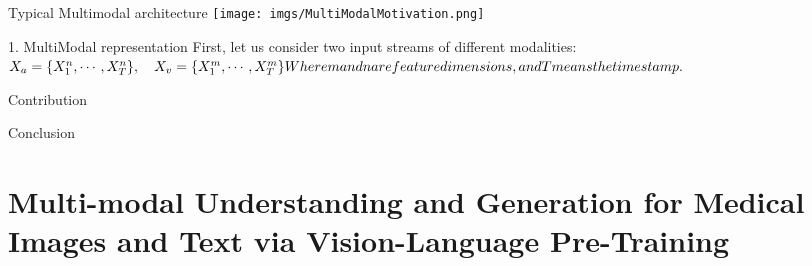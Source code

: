 \documentclass[aspectratio=169]{beamer}
\begin{document}
\begin{frame}{Typical Multimodal architecture}
    \texttt{[image: imgs/MultiModalMotivation.png]}\\
\end{frame}

\begin{frame}{1. MultiModal representation}
    First, let us consider two input streams of different modalities:\\
    \begin{math}
        X_a = \{X_1^n,\cdots,X_T^n\},\quad X_v = \{X_1^m,\cdots,X_T^m\}\\\\

        Where m and n are feature dimensions, and T means the timestamp.

    \end{math}
\end{frame}

\begin{frame}{Contribution}
\end{frame}

\begin{frame}{Conclusion}
\end{frame}
\section{Multi-modal Understanding and Generation for Medical Images and Text
  via Vision-Language Pre-Training}
\end{document}
